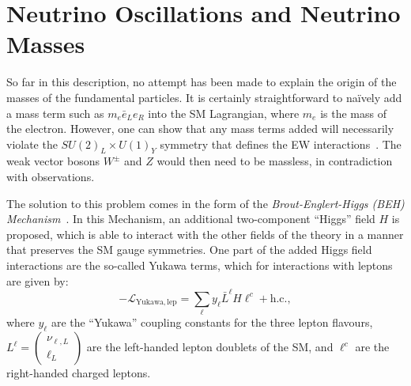 \section{Neutrino Oscillations and Neutrino Masses}
So far in this description, no attempt has been made to explain the origin of the masses of the fundamental particles. It is certainly straightforward to na\"{i}vely add a mass term such as $m_{e}\bar{e}_{L}e_{R}$ into the SM Lagrangian, where $m_e$ is the mass of the electron. However, one can show that any mass terms added will necessarily violate the $SU(2)_{L}\times U(1)_{Y}$ symmetry that defines the EW interactions~\cite{deppischChapterNeutrinosStandard2019}. %
The weak vector bosons $W^{\pm}$ and $Z$ would then need to be massless, in contradiction with observations.

The solution to this problem comes in the form of the \textit{Brout-Englert-Higgs (BEH) Mechanism}~\cite{englertBrokenSymmetryMass1964,higgsBrokenSymmetriesMasses1964,guralnikGlobalConservationLaws1964}. %
In this Mechanism, an additional two-component ``Higgs'' field $H$ is proposed, which is able to interact with the other fields of the theory in a manner that preserves the SM gauge symmetries. One part of the added Higgs field interactions are the so-called Yukawa terms, which for interactions with leptons are given by:
\begin{equation}\label{eq:SM_yukawa_leptons}
    -\mathcal{L}_{\mathrm{Yukawa,lep}} = \sum_{\ell}y_{\ell}\bar{L}^{\ell}H\ell^{c} + \mathrm{h.c.},
\end{equation}
where $y_{\ell}$ are the ``Yukawa'' coupling constants for the three lepton flavours, $L^{\ell} = \begin{pmatrix}
    \nu_{\ell,L} \\ \ell_{L}
\end{pmatrix}$ are the left-handed lepton doublets of the SM, and $\ell^{c}$ are the right-handed charged leptons.

